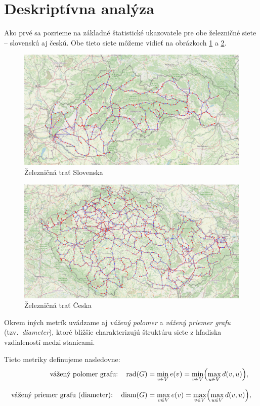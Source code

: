 \documentclass[main.tex]{subfiles}
\begin{document}
\section{Deskriptívna analýza}
Ako prvé sa pozrieme na základné štatistické ukazovatele pre obe železničné siete – slovenskú aj českú. Obe tieto siete môžeme vidieť na obrázkoch \ref{obr:1} a \ref{obr:2}.
\begin{figure}
    \centerline{\includegraphics[width=1.2\textwidth]{images/sk_railroads.png}}
    \caption{Železničná trať Slovenska}
    \label{obr:1}
\end{figure}

\begin{figure}
    \centerline{\includegraphics[width=1.2\textwidth]{images/cze_railroads.png}}
    \caption{Železničná trať Česka}
    \label{obr:2}
\end{figure}

Okrem iných metrík uvádzame aj \emph{vážený polomer} a \emph{vážený priemer grafu} (tzv.~\emph{diameter}), ktoré bližšie charakterizujú štruktúru siete z hľadiska vzdialeností medzi stanicami.

Tieto metriky definujeme nasledovne:
\begin{align*}
  \text{vážený polomer grafu:}\quad
  \operatorname{rad}(G) &= \min_{v \in V} e(v)
                         = \min_{v \in V} \Bigl(\max_{u \in V} d(v, u)\Bigr), \\[6pt]
  \text{vážený priemer grafu (diameter):}\quad
  \operatorname{diam}(G) &= \max_{v \in V} e(v)
                          = \max_{v \in V} \Bigl(\max_{u \in V} d(v, u)\Bigr),
\end{align*}
\end{document}

